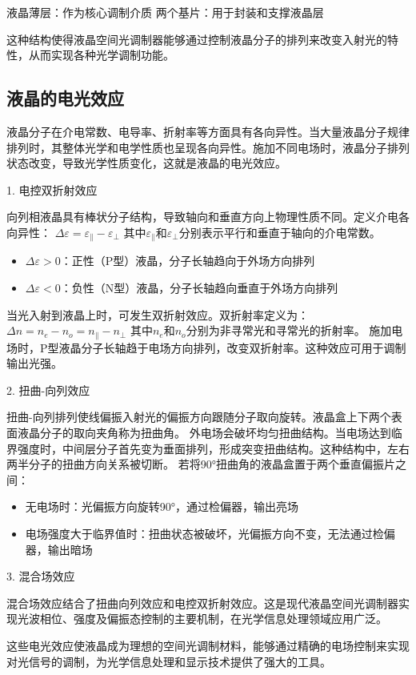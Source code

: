 \documentclass{whureport}
\begin{document}
\begin{multicols}{2}
\begin{itemize}
液晶薄层：作为核心调制介质
两个基片：用于封装和支撑液晶层

这种结构使得液晶空间光调制器能够通过控制液晶分子的排列来改变入射光的特性，从而实现各种光学调制功能。
\end{itemize}
\subsection{液晶的电光效应}
液晶分子在介电常数、电导率、折射率等方面具有各向异性。当大量液晶分子规律排列时，其整体光学和电学性质也呈现各向异性。施加不同电场时，液晶分子排列状态改变，导致光学性质变化，这就是液晶的电光效应。

1. 电控双折射效应

向列相液晶具有棒状分子结构，导致轴向和垂直方向上物理性质不同。定义介电各向异性：
$\Delta\varepsilon = \varepsilon_\parallel - \varepsilon_\perp$
其中$\varepsilon_\parallel$和$\varepsilon_\perp$分别表示平行和垂直于轴向的介电常数。
\begin{itemize}
\item $\Delta\varepsilon > 0$：正性（P型）液晶，分子长轴趋向于外场方向排列
\item $\Delta\varepsilon < 0$：负性（N型）液晶，分子长轴趋向垂直于外场方向排列
\end{itemize}
当光入射到液晶上时，可发生双折射效应。双折射率定义为：
$\Delta n = n_e - n_o = n_\parallel - n_\perp$
其中$n_e$和$n_o$分别为非寻常光和寻常光的折射率。
施加电场时，P型液晶分子长轴趋于电场方向排列，改变双折射率。这种效应可用于调制输出光强。

2. 扭曲-向列效应

扭曲-向列排列使线偏振入射光的偏振方向跟随分子取向旋转。液晶盒上下两个表面液晶分子的取向夹角称为扭曲角。
外电场会破坏均匀扭曲结构。当电场达到临界强度时，中间层分子首先变为垂面排列，形成突变扭曲结构。这种结构中，左右两半分子的扭曲方向关系被切断。
若将90°扭曲角的液晶盒置于两个垂直偏振片之间：
\begin{itemize}
\item 无电场时：光偏振方向旋转90°，通过检偏器，输出亮场
\item 电场强度大于临界值时：扭曲状态被破坏，光偏振方向不变，无法通过检偏器，输出暗场
\end{itemize}

3. 混合场效应

混合场效应结合了扭曲向列效应和电控双折射效应。这是现代液晶空间光调制器实现光波相位、强度及偏振态控制的主要机制，在光学信息处理领域应用广泛。

这些电光效应使液晶成为理想的空间光调制材料，能够通过精确的电场控制来实现对光信号的调制，为光学信息处理和显示技术提供了强大的工具。


\end{multicols}
\end{document}
